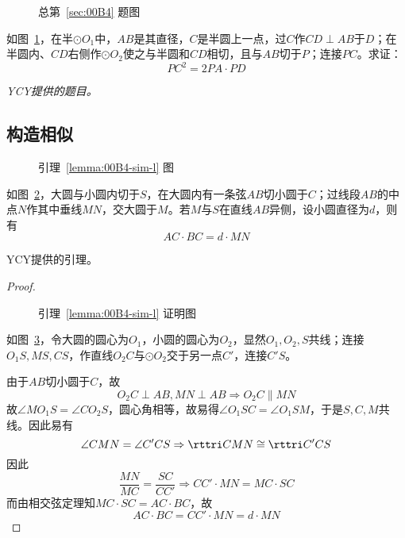 

\begin{figure}[htbp]
  \centering {}
  \caption{总第~\ref{sec:00B4} 题图}
  \label{fig:00B4}
\end{figure}

如图~\ref{fig:00B4}，在半$\odot O_1$中，$AB$是其直径，$C$是半圆上一点，过$C$作$CD \perp AB$于$D$；在半圆内、$CD$右侧作$\odot O_2$使之与半圆和$CD$相切，且与$AB$切于$P$；连接$PC$。求证：
\[ PC^2 = 2PA\cdot PD \]

\emph{YCY提供的题目。}

\subsection{构造相似} \label{subsec:00B4-sim}

\begin{lemma} \label{lemma:00B4-sim-l}
  \begin{figure}
    \centering {}
    \caption{引理~\ref{lemma:00B4-sim-l} 图}
    \label{fig:00B4-sim-l}
  \end{figure}

  如图~\ref{fig:00B4-sim-l}，大圆与小圆内切于$S$，在大圆内有一条弦$AB$切小圆于$C$；过线段$AB$的中点$N$作其中垂线$MN$，交大圆于$M$。若$M$与$S$在直线$AB$异侧，设小圆直径为$d$，则有
  \[ AC \cdot BC = d \cdot MN \]

  YCY提供的引理。
\end{lemma}

\begin{proof}
  \begin{figure}[htbp]
    \centering {}
    \caption{引理~\ref{lemma:00B4-sim-l} 证明图}
    \label{fig:00B4-sim-lp}
  \end{figure}

  如图~\ref{fig:00B4-sim-lp}，令大圆的圆心为$O_1$，小圆的圆心为$O_2$，显然$O_1, O_2, S$共线；连接$O_1S, MS, CS$，作直线$O_2C$与$\odot O_2$交于另一点$C'$，连接$C'S$。

  由于$AB$切小圆于$C$，故
  \[ O_2C \perp AB, MN \perp AB \Rightarrow O_2C \parallel MN \]
  故$\angle MO_1S = \angle CO_2S$，圆心角相等，故易得$\angle O_1SC = \angle O_1SM$，于是$S, C, M$共线。因此易有
  \[ \angle CMN = \angle C'CS \Rightarrow \rttri CMN \cong \rttri C'CS \]
  因此
  \[ \frac{MN}{MC} = \frac{SC}{CC'} \Rightarrow CC' \cdot MN = MC \cdot SC \]
  而由相交弦定理知$MC\cdot SC = AC\cdot BC$，故
  \[ AC \cdot BC = CC' \cdot MN = d \cdot MN \]
\end{proof}

